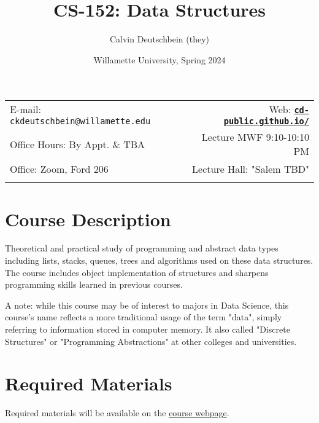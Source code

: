 \documentclass[11pt]{article}
\title{CS-152: Data Structures}
\author{Calvin Deutschbein (they)}
\date{Willamette University, Spring	 2024}
\newcommand{\blankline}{\quad\pagebreak[2]}
\begin{document}
\maketitle

\blankline

\begin{tabular*}{.93\textwidth}{@{\extracolsep{\fill}}lr}


E-mail: \texttt{ckdeutschbein@willamette.edu} & Web: \href{https://cd-public.github.io/courses/data_structures/241f21.html}{\tt\bf cd-public.github.io/}  \\

 Office Hours: By Appt. \& TBA  &  Lecture MWF 9:10-10:10 PM \\

 Office: Zoom, Ford 206 & Lecture Hall: "Salem TBD" \\
 & \\
\hline
\end{tabular*}

\vspace{5 mm}


\section*{Course Description}

Theoretical and practical study of programming and abstract data types including lists, stacks, queues, trees and algorithms used on these data structures. The course includes object implementation of structures and sharpens programming skills learned in previous courses.

A note: while this course may be of interest to majors in Data Science, this course's name reflects a more traditional usage of the term "data", simply referring to information stored in computer memory. It also called "Discrete Structures" or "Programming Abstractions" at other colleges and universities. 

\section*{Required Materials}

Required materials will be available on the \href{https://cd-public.github.io/courses/strs24}{course webpage}.
\end{document}
